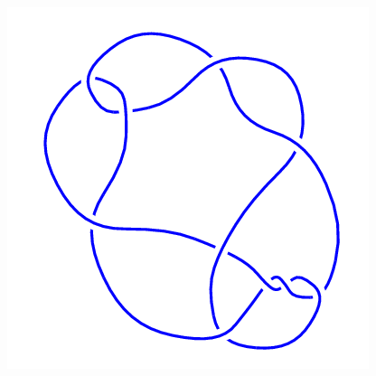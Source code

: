 \begin{figure}[H]
\begin{minipage}[b]{.18\linewidth}
	\end{minipage}
	\begin{minipage}[b]{.18\linewidth}
		\centering
		\includegraphics[width=\linewidth]{../data/10_31.png}
	\end{minipage}
\end{figure}
